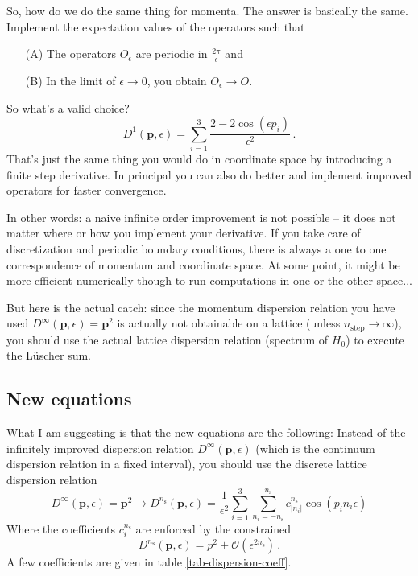 \documentclass[
    aps,
    prl,
    showkeys,
    nofootinbib,
    floatfix
]{revtex4-1}
\renewcommand{\vec}[1]{\boldsymbol{#1}}
\begin{document}
So, how do we do the same thing for momenta.
The answer is basically the same.
Implement the expectation values of the operators such that
\begin{itemize}
    \item[(A)] The operators $O_\epsilon$ are periodic in $\frac{2\pi}{\epsilon}$ and
    \item[(B)] In the limit of $\epsilon \to 0$, you obtain  $O_\epsilon \to  O$.
\end{itemize}

So what's a valid choice?
\begin{equation}
	D^1( \vec p, \epsilon) = \sum_{i=1}^3 \frac{2 - 2 \cos(\epsilon p_i)}{\epsilon^2} \, .
\end{equation}
That's just the same thing you would do in coordinate space by introducing a finite step derivative.
In principal you can also do better and implement improved operators for faster convergence.

In other words: a naive infinite order improvement is not possible -- it does not matter where or how you implement your derivative.
If you take care of discretization and periodic boundary conditions, there is always a one to one correspondence of momentum and coordinate space.
At some point, it might be more efficient numerically though to run computations in one or the other space...

But here is the actual catch: since the momentum dispersion relation you have used $D^\infty(\vec p, \epsilon) = \vec p^2$ is actually not obtainable on a lattice (unless $n_{\mathrm{step}} \to \infty$), you should use the actual lattice dispersion relation (spectrum of $H_0$) to execute the Lüscher sum.

\subsection{New equations}

What I am suggesting is that the new equations are the following:
Instead of the infinitely improved dispersion relation $D^\infty(\vec p, \epsilon)$ (which is the continuum dispersion relation in a fixed interval), you should use the discrete lattice dispersion relation
\begin{equation}
    D^\infty(\vec p, \epsilon) = \vec p ^2 
    \to 
    D^{n_{\mathrm{s}}}(\vec p, \epsilon) 
    =
    \frac{1}{\epsilon^2} \sum\limits_{i=1}^3 \sum\limits_{n_i=-n_{\mathrm{s}}}^{n_{\mathrm{s}}} c_{|n_i|}^{n_{\mathrm{s}}} \cos( p_i n_i \epsilon)
\end{equation}
Where the coefficients $c_i^{n_{\mathrm{s}}}$ are enforced by the constrained
\begin{equation}
    D^{n_{\mathrm{s}}}(\vec p, \epsilon)
    =
    p^2 + \mathcal O \left(\epsilon^{2 n_{\mathrm{s}}}\right)
    \, .
\end{equation}
A few coefficients are given in table \ref{tab-dispersion-coeff}.
\end{document}
